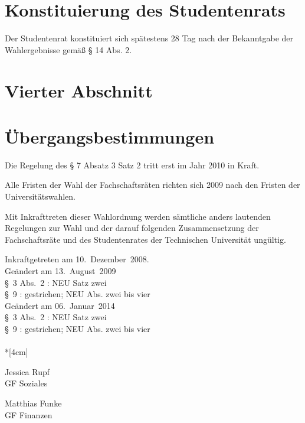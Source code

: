 \begin{multicols}{2}
\section{Konstituierung des Studentenrats}
\Abs \Satz Der Studentenrat konstituiert sich spätestens 28 Tag nach der Bekanntgabe der Wahlergebnisse gemäß § 14 Abs. 2.

\section*{Vierter Abschnitt}
\section{Übergangsbestimmungen}
\Abs \Satz Die Regelung des § 7 Absatz 3 Satz 2 tritt erst im Jahr 2010 in Kraft.

\Abs \Satz Alle Fristen der Wahl der Fachschaftsräten richten sich 2009 nach den Fristen der Universitätswahlen.

\Abs \Satz Mit Inkrafttreten dieser Wahlordnung werden sämtliche anders lautenden Regelungen zur Wahl und der darauf folgenden Zusammensetzung der Fachschaftsräte und des Studentenrates der Technischen Universität ungültig.
\end{multicols}
\nopagebreak
\vspace{1cm}
Inkraftgetreten am 10.~Dezember~2008.
\\ 
  

\footnotesize
Geändert am 13.~August~2009\\
§~3 Abs.~2 : NEU Satz zwei\\
§~9 : gestrichen;  NEU Abs. zwei bis vier\\

Geändert am 06.~Januar~2014\\
§~3 Abs.~2 : NEU Satz zwei\\
§~9 : gestrichen;  NEU Abs. zwei bis vier\\

\normalsize
~\\*[4cm]
\begin{center}
\hspace*{\fill}
\parbox{7cm}{Jessica Rupf\\GF Soziales}
\hfill\parbox{7cm}{Matthias Funke\\GF Finanzen}
\hspace*{\fill}
\end{center}     

